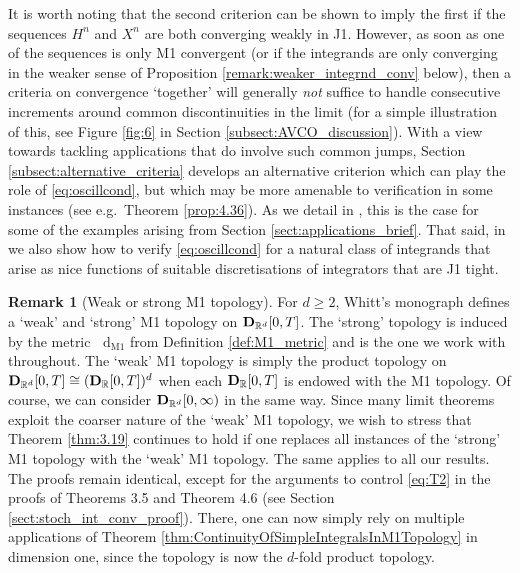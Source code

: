 \documentclass[11pt]{article}
\theoremstyle{definition}\newtheorem{example}[theorem]{Example}
\theoremstyle{definition}\newtheorem{counterexample}[theorem]{Counterexample}
\theoremstyle{definition}\newtheorem{remark}[theorem]{Remark}
\theoremstyle{definition}\newtheorem{defi}[theorem]{Definition}
\numberwithin{equation}{section}
\newcommand{\D}{{\bf D}}											%
\newcommand*\diff{\mathop{}\!\mathrm{d}}								%
\renewcommand{\|}{\; : \, \;}											%
\newcommand{\dM}{\diff_{\operatorname{M1}}}							%
\begin{document}
It is worth noting that the second criterion can be shown to imply the first if the sequences $H^n$ and $X^n$ are both converging weakly in J1. However, as soon as one of the sequences is only M1 convergent (or if the integrands are only converging in the weaker sense of Proposition \ref{remark:weaker_integrnd_conv} below), then a criteria on convergence `together' will generally \emph{not} suffice to handle consecutive increments around common discontinuities in the limit (for a simple illustration of this, see Figure \ref{fig:6} in Section \ref{subsect:AVCO_discussion}). With a view towards tackling applications that do involve such common jumps, Section \ref{subsect:alternative_criteria} develops an alternative criterion which can play the role of \eqref{eq:oscillcond}, but which may be more amenable to verification in some instances (see e.g.~Theorem \ref{prop:4.36}). As we detail in \cite{andreasfabrice_applications}, this is the case for some of the examples arising from Section \ref{sect:applications_brief}. That said, in \cite{andreasfabrice_applications} we also show how to verify \eqref{eq:oscillcond} for a natural class of integrands that arise as nice functions of suitable discretisations of integrators that are J1 tight.


\begin{remark}[Weak or strong M1 topology]\label{rem:weakM1} For $d\geq 2$, Whitt's monograph \cite{whitt} defines a `weak' and `strong' M1 topology on $\D_{\mathbb{R}^{d}}[0,T]$. The `strong' topology is induced by the metric $\dM$ from Definition \ref{def:M1_metric} and is the one we work with throughout. The `weak' M1 topology is simply the product topology on $\D_{\mathbb{R}^{d}}[0,T] \cong (\D_{\mathbb{R}}[0,T])^{ d} $ when each $\D_{\mathbb{R}}[0,T]$ is endowed with the M1 topology. Of course, we can consider $\D_{\mathbb{R}^{d}}[0,\infty)$ in the same way. Since many limit theorems exploit the coarser nature of the `weak' M1 topology, we wish to stress that Theorem \ref{thm:3.19} continues to hold if one replaces all instances of the `strong' M1 topology with the `weak' M1 topology. The same applies to all our results. The proofs remain identical, except for the arguments to control \eqref{eq:T2} in the proofs of Theorems 3.5 and Theorem 4.6 (see Section \ref{sect:stoch_int_conv_proof}). There, one can now simply rely on multiple applications of Theorem \ref{thm:ContinuityOfSimpleIntegralsInM1Topology} in dimension one, since the topology is now the $d$-fold product topology.
\end{remark}
\end{document}
